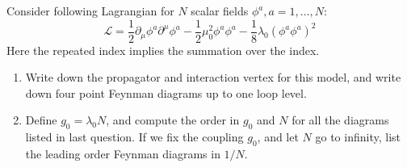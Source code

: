 \begin{exercise}
\label{physics:2022:6}
Consider following Lagrangian for $N$ scalar fields $\phi^a, a = 1, \dots, N$:
\begin{equation}
    \mathcal{L} = \frac{1}{2} \partial_\mu \phi^a \partial^\mu \phi^a - \frac{1}{2} \mu_0^2 \phi^a \phi^a - \frac{1}{8} \lambda_0 (\phi^a \phi^a)^2
\end{equation}
Here the repeated index implies the summation over the index.

\begin{enumerate}[label=(\alph*)]
    \item Write down the propagator and interaction vertex for this model, and write down four point Feynman diagrams up to one loop level.
    \item Define $g_0 = \lambda_0 N$, and compute the order in $g_0$ and $N$ for all the diagrams listed in last question. If we fix the coupling $g_0$, and let $N$ go to infinity, list the leading order Feynman diagrams in $1/N$.
\end{enumerate}
\end{exercise}

